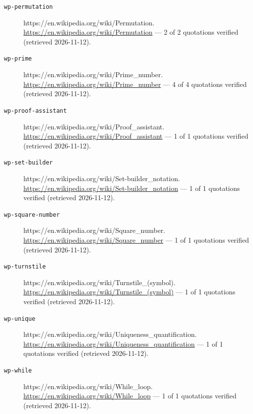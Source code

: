 \documentclass[11pt,letterpaper,openright]{book}
\begin{document}
\begin{description}
\item[\texttt{wp-permutation}] https://en.wikipedia.org/wiki/Permutation. \url{https://en.wikipedia.org/wiki/Permutation} --- 2 of 2 quotations verified (retrieved 2026-11-12).
\item[\texttt{wp-prime}] https://en.wikipedia.org/wiki/Prime\_number. \url{https://en.wikipedia.org/wiki/Prime_number} --- 4 of 4 quotations verified (retrieved 2026-11-12).
\item[\texttt{wp-proof-assistant}] https://en.wikipedia.org/wiki/Proof\_assistant. \url{https://en.wikipedia.org/wiki/Proof_assistant} --- 1 of 1 quotations verified (retrieved 2026-11-12).
\item[\texttt{wp-set-builder}] https://en.wikipedia.org/wiki/Set-builder\_notation. \url{https://en.wikipedia.org/wiki/Set-builder_notation} --- 1 of 1 quotations verified (retrieved 2026-11-12).
\item[\texttt{wp-square-number}] https://en.wikipedia.org/wiki/Square\_number. \url{https://en.wikipedia.org/wiki/Square_number} --- 1 of 1 quotations verified (retrieved 2026-11-12).
\item[\texttt{wp-turnstile}] https://en.wikipedia.org/wiki/Turnstile\_(symbol). \url{https://en.wikipedia.org/wiki/Turnstile_(symbol)} --- 1 of 1 quotations verified (retrieved 2026-11-12).
\item[\texttt{wp-unique}] https://en.wikipedia.org/wiki/Uniqueness\_quantification. \url{https://en.wikipedia.org/wiki/Uniqueness_quantification} --- 1 of 1 quotations verified (retrieved 2026-11-12).
\item[\texttt{wp-while}] https://en.wikipedia.org/wiki/While\_loop. \url{https://en.wikipedia.org/wiki/While_loop} --- 1 of 1 quotations verified (retrieved 2026-11-12).\end{description}
\printindex
\end{document}
